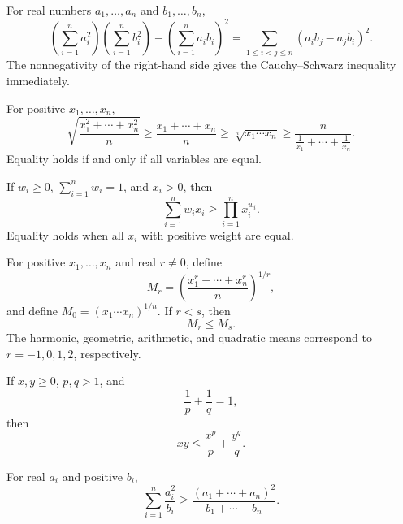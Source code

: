     \begin{theorem}
        For real numbers $a_1,\dots,a_n$ and $b_1,\dots,b_n$,
        \[
            \left(\sum_{i=1}^{n}a_i^2\right)
            \left(\sum_{i=1}^{n}b_i^2\right)
            -
            \left(\sum_{i=1}^{n}a_ib_i\right)^2
            =
            \sum_{1\leq i<j\leq n}(a_ib_j-a_jb_i)^2.
        \]
        The nonnegativity of the right-hand side gives the
        Cauchy--Schwarz inequality immediately.
    \end{theorem}

    \begin{theorem}[QM--AM--GM--HM Inequalities]
        For positive $x_1,\dots,x_n$,
        \[
            \sqrt{\frac{x_1^2+\cdots+x_n^2}{n}}
            \geq
            \frac{x_1+\cdots+x_n}{n}
            \geq
            \sqrt[n]{x_1\cdots x_n}
            \geq
            \frac{n}{\frac1{x_1}+\cdots+\frac1{x_n}}.
        \]
        Equality holds if and only if all variables are equal.
    \end{theorem}

    \begin{theorem}
        If $w_i\geq0$, $\sum_{i=1}^{n}w_i=1$, and $x_i>0$, then
        \[
            \sum_{i=1}^{n}w_ix_i
            \geq
            \prod_{i=1}^{n}x_i^{w_i}.
        \]
        Equality holds when all $x_i$ with positive weight are equal.
    \end{theorem}

    \begin{theorem}
        For positive $x_1,\dots,x_n$ and real $r\neq0$, define
        \[
            M_r
            =
            \left(
                \frac{x_1^r+\cdots+x_n^r}{n}
            \right)^{1/r},
        \]
        and define $M_0=(x_1\cdots x_n)^{1/n}$. If $r<s$, then
        \[
            M_r\leq M_s.
        \]
        The harmonic, geometric, arithmetic, and quadratic means correspond to
        $r=-1,0,1,2$, respectively.
    \end{theorem}

    \begin{theorem}
        If $x,y\geq0$, $p,q>1$, and
        \[
            \frac1p+\frac1q=1,
        \]
        then
        \[
            xy\leq\frac{x^p}{p}+\frac{y^q}{q}.
        \]
    \end{theorem}

    \begin{theorem}
        For real $a_i$ and positive $b_i$,
        \[
            \sum_{i=1}^{n}\frac{a_i^2}{b_i}
            \geq
            \frac{(a_1+\cdots+a_n)^2}{b_1+\cdots+b_n}.
        \]
    \end{theorem}

